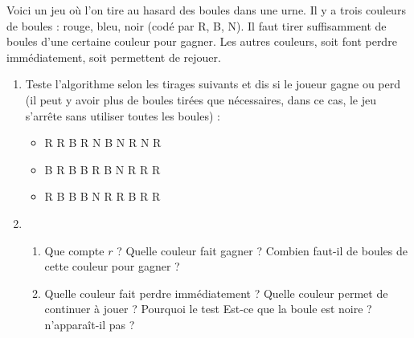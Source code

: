 \documentclass[class=report,crop=false, 12pt]{standalone}
\begin{document}
\begin{activite}
Voici un jeu où l'on tire au hasard des boules dans une urne. Il y a trois couleurs de boules : rouge, bleu, noir (codé par R, B, N). Il faut tirer suffisamment de boules d'une certaine couleur pour gagner. Les autres couleurs, soit font perdre immédiatement, soit permettent de rejouer.


\begin{enumerate}
  \item Teste l'algorithme selon les tirages suivants et dis si le joueur gagne ou perd (il peut y avoir plus de boules tirées que nécessaires, dans ce cas, le jeu s'arrête sans utiliser toutes les boules) :
  
  \begin{itemize}
    \item R R B R N B N R N R
    \item B R B B R B N R R R
    \item R B B B N R R B R R
  \end{itemize}
  
  \item  
  \begin{enumerate}
    \item Que compte $r$ ? Quelle couleur fait gagner ? Combien faut-il de boules de cette couleur pour gagner ?
    
    \item Quelle couleur fait perdre immédiatement ? Quelle couleur permet de continuer à jouer ?  Pourquoi le test \og Est-ce que la boule est noire ? \fg{} n'apparaît-il pas ?
  
  \end{enumerate}
  

\end{enumerate} 
\end{activite}
\end{document}
